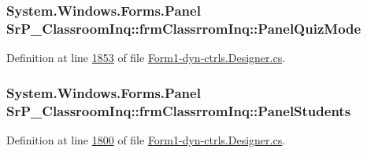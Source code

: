 \hypertarget{class_sr_p___classroom_inq_1_1frm_classrrom_inq_a0dfa3465bc2680dd54dfeacc88b39bee}{
\subsubsection[{\-Panel\-Quiz\-Mode}]{\setlength{\rightskip}{0pt plus 5cm}\-System.\-Windows.\-Forms.\-Panel {\bf \-Sr\-P\-\_\-\-Classroom\-Inq\-::frm\-Classrrom\-Inq\-::\-Panel\-Quiz\-Mode}}}
\label{class_sr_p___classroom_inq_1_1frm_classrrom_inq_a0dfa3465bc2680dd54dfeacc88b39bee}


\-Definition at line \hyperlink{_form1-dyn-ctrls_8_designer_8cs_source_l01853}{1853} of file \hyperlink{_form1-dyn-ctrls_8_designer_8cs_source}{\-Form1-\/dyn-\/ctrls.\-Designer.\-cs}.

\hypertarget{class_sr_p___classroom_inq_1_1frm_classrrom_inq_a70fa7dcce9d5cbc3564066532704c216}{
\subsubsection[{\-Panel\-Students}]{\setlength{\rightskip}{0pt plus 5cm}\-System.\-Windows.\-Forms.\-Panel {\bf \-Sr\-P\-\_\-\-Classroom\-Inq\-::frm\-Classrrom\-Inq\-::\-Panel\-Students}}}
\label{class_sr_p___classroom_inq_1_1frm_classrrom_inq_a70fa7dcce9d5cbc3564066532704c216}


\-Definition at line \hyperlink{_form1-dyn-ctrls_8_designer_8cs_source_l01800}{1800} of file \hyperlink{_form1-dyn-ctrls_8_designer_8cs_source}{\-Form1-\/dyn-\/ctrls.\-Designer.\-cs}.

